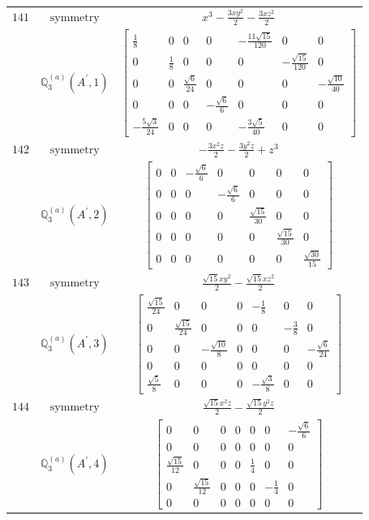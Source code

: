\documentclass[fleqn,8pt,landscape]{jsarticle}
\begin{document}
\begin{longtable}{ccc}
$ 141 $ & $ \text{symmetry} $ & $ x^{3} - \frac{3 x y^{2}}{2} - \frac{3 x z^{2}}{2} $ \\
$  $ & $ \mathbb{Q}_{3}^{(a)}(A^{\prime},1) $ & $ \begin{bmatrix} \frac{1}{8} & 0 & 0 & 0 & - \frac{11 \sqrt{15}}{120} & 0 & 0 \\ 0 & \frac{1}{8} & 0 & 0 & 0 & - \frac{\sqrt{15}}{120} & 0 \\ 0 & 0 & \frac{\sqrt{6}}{24} & 0 & 0 & 0 & - \frac{\sqrt{10}}{40} \\ 0 & 0 & 0 & - \frac{\sqrt{6}}{6} & 0 & 0 & 0 \\ - \frac{5 \sqrt{3}}{24} & 0 & 0 & 0 & - \frac{3 \sqrt{5}}{40} & 0 & 0 \end{bmatrix} $ \\ \hline
$ 142 $ & $ \text{symmetry} $ & $ - \frac{3 x^{2} z}{2} - \frac{3 y^{2} z}{2} + z^{3} $ \\
$  $ & $ \mathbb{Q}_{3}^{(a)}(A^{\prime},2) $ & $ \begin{bmatrix} 0 & 0 & - \frac{\sqrt{6}}{6} & 0 & 0 & 0 & 0 \\ 0 & 0 & 0 & - \frac{\sqrt{6}}{6} & 0 & 0 & 0 \\ 0 & 0 & 0 & 0 & \frac{\sqrt{15}}{30} & 0 & 0 \\ 0 & 0 & 0 & 0 & 0 & \frac{\sqrt{15}}{30} & 0 \\ 0 & 0 & 0 & 0 & 0 & 0 & \frac{\sqrt{30}}{15} \end{bmatrix} $ \\ \hline
$ 143 $ & $ \text{symmetry} $ & $ \frac{\sqrt{15} x y^{2}}{2} - \frac{\sqrt{15} x z^{2}}{2} $ \\
$  $ & $ \mathbb{Q}_{3}^{(a)}(A^{\prime},3) $ & $ \begin{bmatrix} \frac{\sqrt{15}}{24} & 0 & 0 & 0 & - \frac{1}{8} & 0 & 0 \\ 0 & \frac{\sqrt{15}}{24} & 0 & 0 & 0 & - \frac{3}{8} & 0 \\ 0 & 0 & - \frac{\sqrt{10}}{8} & 0 & 0 & 0 & - \frac{\sqrt{6}}{24} \\ 0 & 0 & 0 & 0 & 0 & 0 & 0 \\ \frac{\sqrt{5}}{8} & 0 & 0 & 0 & - \frac{\sqrt{3}}{8} & 0 & 0 \end{bmatrix} $ \\ \hline
$ 144 $ & $ \text{symmetry} $ & $ \frac{\sqrt{15} x^{2} z}{2} - \frac{\sqrt{15} y^{2} z}{2} $ \\
$  $ & $ \mathbb{Q}_{3}^{(a)}(A^{\prime},4) $ & $ \begin{bmatrix} 0 & 0 & 0 & 0 & 0 & 0 & - \frac{\sqrt{6}}{6} \\ 0 & 0 & 0 & 0 & 0 & 0 & 0 \\ \frac{\sqrt{15}}{12} & 0 & 0 & 0 & \frac{1}{4} & 0 & 0 \\ 0 & \frac{\sqrt{15}}{12} & 0 & 0 & 0 & - \frac{1}{4} & 0 \\ 0 & 0 & 0 & 0 & 0 & 0 & 0 \end{bmatrix} $ \\ \hline

\end{longtable}
\end{document}

